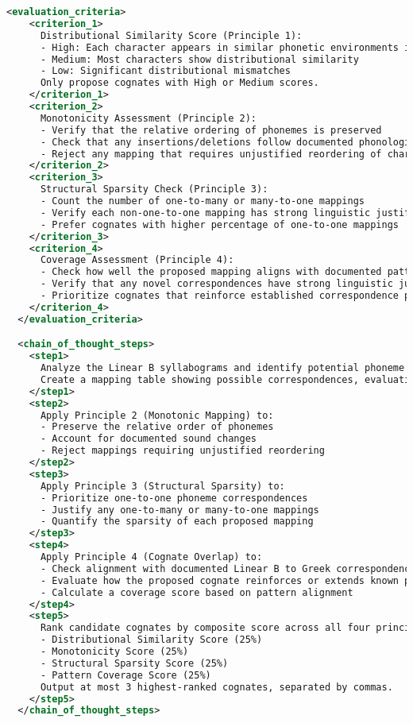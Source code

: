 \begin{lstlisting}[style=mystyle, language=XML, breaklines=true]
  <evaluation_criteria>
    <criterion_1>
      Distributional Similarity Score (Principle 1):
      - High: Each character appears in similar phonetic environments in both words
      - Medium: Most characters show distributional similarity
      - Low: Significant distributional mismatches
      Only propose cognates with High or Medium scores.
    </criterion_1>
    <criterion_2>
      Monotonicity Assessment (Principle 2):
      - Verify that the relative ordering of phonemes is preserved
      - Check that any insertions/deletions follow documented phonological rules
      - Reject any mapping that requires unjustified reordering of characters
    </criterion_2>
    <criterion_3>
      Structural Sparsity Check (Principle 3):
      - Count the number of one-to-many or many-to-one mappings
      - Verify each non-one-to-one mapping has strong linguistic justification
      - Prefer cognates with higher percentage of one-to-one mappings
    </criterion_3>
    <criterion_4>
      Coverage Assessment (Principle 4):
      - Check how well the proposed mapping aligns with documented patterns
      - Verify that any novel correspondences have strong linguistic justification
      - Prioritize cognates that reinforce established correspondence patterns
    </criterion_4>
  </evaluation_criteria>

  <chain_of_thought_steps>
    <step1>
      Analyze the Linear B syllabograms and identify potential phoneme values.
      Create a mapping table showing possible correspondences, evaluating each against Principle 1 (Distributional Similarity).
    </step1>
    <step2>
      Apply Principle 2 (Monotonic Mapping) to:
      - Preserve the relative order of phonemes
      - Account for documented sound changes
      - Reject mappings requiring unjustified reordering
    </step2>
    <step3>
      Apply Principle 3 (Structural Sparsity) to:
      - Prioritize one-to-one phoneme correspondences
      - Justify any one-to-many or many-to-one mappings
      - Quantify the sparsity of each proposed mapping
    </step3>
    <step4>
      Apply Principle 4 (Cognate Overlap) to:
      - Check alignment with documented Linear B to Greek correspondence patterns
      - Evaluate how the proposed cognate reinforces or extends known patterns
      - Calculate a coverage score based on pattern alignment
    </step4>
    <step5>
      Rank candidate cognates by composite score across all four principles:
      - Distributional Similarity Score (25%)
      - Monotonicity Score (25%)
      - Structural Sparsity Score (25%)
      - Pattern Coverage Score (25%)
      Output at most 3 highest-ranked cognates, separated by commas.
    </step5>
  </chain_of_thought_steps>


\end{lstlisting}
